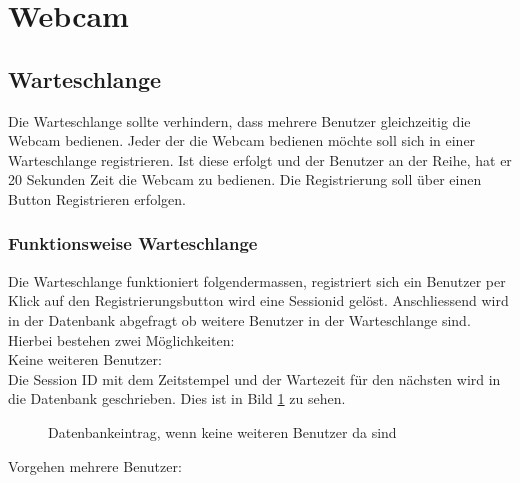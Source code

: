 \section{Webcam}


\subsection{Warteschlange}
Die Warteschlange sollte verhindern, dass mehrere Benutzer gleichzeitig die Webcam bedienen. Jeder der die Webcam bedienen möchte soll sich in einer Warteschlange registrieren. Ist diese erfolgt und der Benutzer an der Reihe, hat er 20 Sekunden Zeit die Webcam zu bedienen. Die Registrierung soll über einen Button Registrieren erfolgen.

\subsubsection{Funktionsweise Warteschlange}
Die Warteschlange funktioniert folgendermassen, registriert sich ein Benutzer per Klick auf den Registrierungsbutton wird eine Sessionid gelöst. Anschliessend wird in der Datenbank abgefragt ob weitere Benutzer in der Warteschlange sind. Hierbei bestehen zwei Möglichkeiten:\\

Keine weiteren Benutzer:\\
Die Session ID mit dem Zeitstempel und der Wartezeit für den nächsten wird in die Datenbank geschrieben. Dies ist in Bild \ref{img:tblqueue} zu sehen. 
\begin{figure}[h!]
	\centering
	\caption{Datenbankeintrag, wenn keine weiteren Benutzer da sind}
	\label{img:tblqueue}
\end{figure}

Vorgehen mehrere Benutzer:\\

